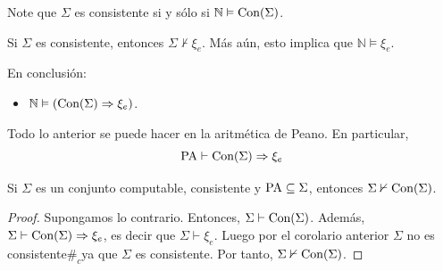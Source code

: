 \documentclass[12pt]{report}
\newcounter{it}
\theoremstyle{largebreak}
\newcommand\contradiction{\ensuremath{\#_c}}
\begin{document}
    \begin{obs}
        Note que $\Sigma$ es consistente si y sólo si $\mathbb{N}\vDash\textup{Con}(\Sigma)$.
    \end{obs}

    \begin{cor}
        Si $\Sigma$ es consistente, entonces $\Sigma\nvdash\xi_e$. Más aún, esto implica que $\mathbb{N}\vDash\xi_e$.
    \end{cor}

    En conclusión:

    \begin{itemize}
        \item $\mathbb{N}\vDash(\textup{Con}(\Sigma)\Rightarrow\xi_e)$.
    \end{itemize}

    \begin{lema}
        Todo lo anterior se puede hacer en la aritmética de Peano. En particular,
        \begin{equation*}
            \textup{PA}\vdash\textup{Con}(\Sigma)\Rightarrow\xi_e
        \end{equation*}
    \end{lema}

    \begin{theor}
        Si $\Sigma$ es un conjunto computable, consistente y $\textup{PA}\subseteq\Sigma$, entonces $\Sigma\nvdash\textup{Con}(\Sigma)$.
    \end{theor}

    \begin{proof}
        Supongamos lo contrario. Entonces, $\Sigma\vdash\textup{Con}(\Sigma)$. Además, $\Sigma\vdash\textup{Con}(\Sigma)\Rightarrow\xi_e$, es decir que $\Sigma\vdash\xi_e$. Luego por el corolario anterior $\Sigma$ no es consistente\contradiction ya que $\Sigma$ es consistente. Por tanto, $\Sigma\nvdash\textup{Con}(\Sigma)$.
        
    \end{proof}
    
\end{document}
